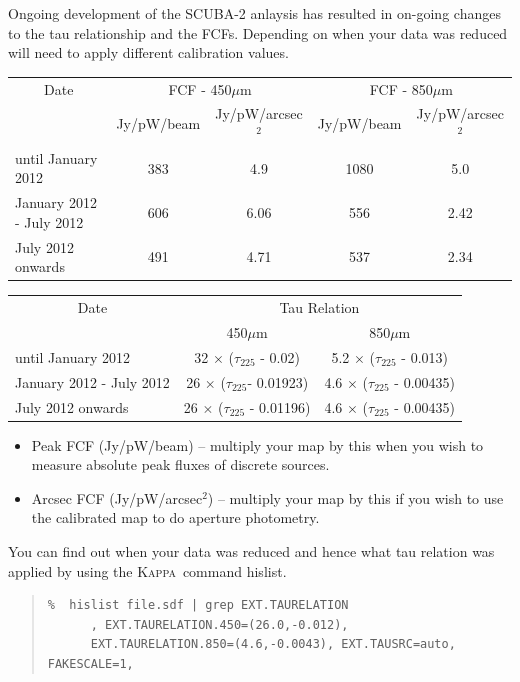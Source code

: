\documentclass[twoside,11pt]{article}
\newcommand{\xref}[3]{#1}
\renewcommand{\_}{\texttt{\symbol{95}}}
\newenvironment{myquote}{\begin{quote}\begin{small}}{\end{small}\end{quote}}
\newcommand{\Kappa}{\xref{\textsc{Kappa}}{sun95}{}}
\newcommand{\task}[1]{\textsf{#1}}
\newcommand{\hislist}{\xref{\task{hislist}}{sun95}{HISLIST}}
\begin{document}
Ongoing development of the SCUBA-2 anlaysis has resulted in on-going
changes to the tau relationship and the FCFs. Depending on when your
data was reduced will need to apply different calibration values.
\\
\begin{table}[h!]
\begin{center}
\begin{tabular}{|l|c|c|c|c|}
 \hline
 \multicolumn{1}{|c|}{Date}      &
 \multicolumn{2}{c|}{FCF - 450$\mu$m}  &
\multicolumn{2}{c|}{FCF - 850$\mu$m}      \\
\cline{2-5}
& Jy/pW/beam &Jy/pW/arcsec$^2$& Jy/pW/beam &Jy/pW/arcsec$^2$ \\
 \hline
until January 2012 &383  & 4.9&1080 &5.0 \\
January 2012 - July 2012&606&6.06 &556 &2.42 \\
July 2012 onwards&491 &4.71 &537 &2.34 \\
\hline
\end{tabular}
\end{center}
\end{table}
\vspace{-2mm}
\begin{table}[h!]
\begin{center}
\begin{tabular}{|l|c|c|}
 \hline
 \multicolumn{1}{|c}{Date} & \multicolumn{2}{|c|}{Tau Relation}  \\ \cline{2-3}
                           & 450$\mu$m  & 850$\mu$m \\ \hline
until January 2012       & 32 $\times$ ($\tau_{225}$ - 0.02)    & 5.2 $\times$ ($\tau_{225}$ - 0.013)  \\
January 2012 - July 2012 & 26 $\times$ ($\tau_{225}$- 0.01923)  & 4.6 $\times$ ($\tau_{225}$ - 0.00435)  \\
July 2012 onwards        & 26 $\times$ ($\tau_{225}$ - 0.01196) & 4.6 $\times$ ($\tau_{225}$ - 0.00435)  \\
\hline
\end{tabular}
\end{center}
\end{table}
\vspace{-5mm}
\begin{itemize}
\item Peak FCF (Jy/pW/beam) -- multiply your map by this when you wish
to measure absolute peak fluxes of discrete sources.
\item Arcsec FCF (Jy/pW/arcsec$^2$) -- multiply your map by this if
you wish to use the calibrated map to do aperture photometry.
\end{itemize}
You can find out when your data was reduced and hence what tau
relation was applied by using the \Kappa\ command \hislist.
\vspace{-2mm}
\begin{myquote}
\begin{verbatim}
%  hislist file.sdf | grep EXT.TAURELATION
      , EXT.TAURELATION.450=(26.0,-0.012),
      EXT.TAURELATION.850=(4.6,-0.0043), EXT.TAUSRC=auto, FAKESCALE=1,
\end{verbatim}
\end{myquote}
\end{document}

